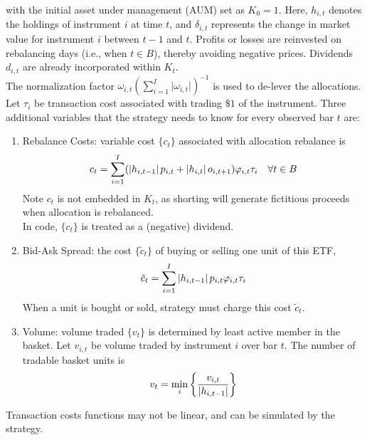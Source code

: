 \begin{method}
with the initial asset under management (AUM) set as $K_0 = 1$. Here, $h_{i,t}$ denotes the holdings of instrument $i$ at time $t$, and $\delta_{i,t}$ represents the change in market value for instrument $i$ between $t-1$ and $t$. Profits or losses are reinvested on rebalancing days (i.e., when $t \in B$), thereby avoiding negative prices. Dividends $d_{i,t}$ are already incorporated within $K_t$.\\
The normalization factor $\omega_{i,t}\left(\sum_{i=1}^I \lvert \omega_{i,t} \rvert \right)^{-1}$ is used to de-lever the allocations.\\
Let $\tau_i$ be transaction cost associated with trading $\$1$ of the instrument. Three additional variables that the strategy needs to know for every observed bar $t$ are:
\begin{enumerate}[label=\roman*.]
\setlength{\itemsep}{0pt}
\item Rebalance Costs: variable cost $\{c_t\}$ associated with allocation rebalance is
\begin{equation}
c_t = \sum\limits_{i=1}^I (\left\lvert h_{i, t-1}\right\rvert p_{i,t} + \left\lvert h_{i,t}\right\rvert o_{i, t+1}) \varphi_{i,t} \tau_{i} \ \ \ \forall t \in B \nonumber
\end{equation}
Note $c_t$ is not embedded in $K_t$, as shorting will generate fictitious proceeds when allocation is rebalanced.\\
In code, $\{c_t\}$ is treated as a (negative) dividend.
\item Bid-Ask Spread: the cost $\{ \tilde{c}_t \}$ of buying or selling one unit of this ETF,
\begin{equation}
\tilde{c}_t = \sum\limits_{i=1}^I \left\lvert h_{i, t-1}\right\rvert p_{i, t} \varphi_{i,t} \tau_i \nonumber
\end{equation}
When a unit is bought or sold, strategy must charge this cost $\tilde{c}_t$.
\item Volume: volume traded $\{v_t \}$ is determined by least active member in the basket. Let $v_{i,t}$ be volume traded by instrument $i$ over bar $t$. The number of tradable basket units is
\begin{equation}
v_t = \min_i \left\{ \frac{v_{i,t}}{\left\lvert h_{i, t-1}\right\rvert} \right\} \nonumber
\end{equation}
\end{enumerate}
Transaction costs functions may not be linear, and can be simulated by the strategy.
\end{method}

